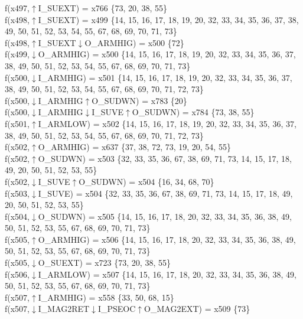 f(x497,$\uparrow$I\_SUEXT) = x766 \{73, 20, 38, 55\} \\  
f(x498,$\uparrow$I\_SUEXT) = x499 \{14, 15, 16, 17, 18, 19, 20, 32, 33, 34, 35, 36, 37, 38, 49, 50, 51, 52, 53, 54, 55, 67, 68, 69, 70, 71, 73\} \\  
f(x498,$\uparrow$I\_SUEXT$\downarrow$O\_ARMHIG) = x500 \{72\} \\  
f(x499,$\downarrow$O\_ARMHIG) = x500 \{14, 15, 16, 17, 18, 19, 20, 32, 33, 34, 35, 36, 37, 38, 49, 50, 51, 52, 53, 54, 55, 67, 68, 69, 70, 71, 73\} \\  
f(x500,$\downarrow$I\_ARMHIG) = x501 \{14, 15, 16, 17, 18, 19, 20, 32, 33, 34, 35, 36, 37, 38, 49, 50, 51, 52, 53, 54, 55, 67, 68, 69, 70, 71, 72, 73\} \\  
f(x500,$\downarrow$I\_ARMHIG$\uparrow$O\_SUDWN) = x783 \{20\} \\  
f(x500,$\downarrow$I\_ARMHIG$\downarrow$I\_SUVE$\uparrow$O\_SUDWN) = x784 \{73, 38, 55\} \\  
f(x501,$\uparrow$I\_ARMLOW) = x502 \{14, 15, 16, 17, 18, 19, 20, 32, 33, 34, 35, 36, 37, 38, 49, 50, 51, 52, 53, 54, 55, 67, 68, 69, 70, 71, 72, 73\} \\  
f(x502,$\uparrow$O\_ARMHIG) = x637 \{37, 38, 72, 73, 19, 20, 54, 55\} \\  
f(x502,$\uparrow$O\_SUDWN) = x503 \{32, 33, 35, 36, 67, 38, 69, 71, 73, 14, 15, 17, 18, 49, 20, 50, 51, 52, 53, 55\} \\  
f(x502,$\downarrow$I\_SUVE$\uparrow$O\_SUDWN) = x504 \{16, 34, 68, 70\} \\  
f(x503,$\downarrow$I\_SUVE) = x504 \{32, 33, 35, 36, 67, 38, 69, 71, 73, 14, 15, 17, 18, 49, 20, 50, 51, 52, 53, 55\} \\  
f(x504,$\downarrow$O\_SUDWN) = x505 \{14, 15, 16, 17, 18, 20, 32, 33, 34, 35, 36, 38, 49, 50, 51, 52, 53, 55, 67, 68, 69, 70, 71, 73\} \\  
f(x505,$\uparrow$O\_ARMHIG) = x506 \{14, 15, 16, 17, 18, 20, 32, 33, 34, 35, 36, 38, 49, 50, 51, 52, 53, 55, 67, 68, 69, 70, 71, 73\} \\  
f(x505,$\downarrow$O\_SUEXT) = x723 \{73, 20, 38, 55\} \\  
f(x506,$\downarrow$I\_ARMLOW) = x507 \{14, 15, 16, 17, 18, 20, 32, 33, 34, 35, 36, 38, 49, 50, 51, 52, 53, 55, 67, 68, 69, 70, 71, 73\} \\  
f(x507,$\uparrow$I\_ARMHIG) = x558 \{33, 50, 68, 15\} \\  
f(x507,$\downarrow$I\_MAG2RET$\downarrow$I\_PSEOC$\uparrow$O\_MAG2EXT) = x509 \{73\} \\  

